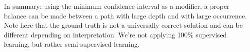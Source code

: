 In summary: using the minimum confidence interval as a modifier, a proper balance can be made between a path with large depth and with large occurrence. Note here that the ground truth is not a universally correct solution and can be different depending on interpretation. We're not applying 100\% supervised learning, but rather semi-supervised learning.



